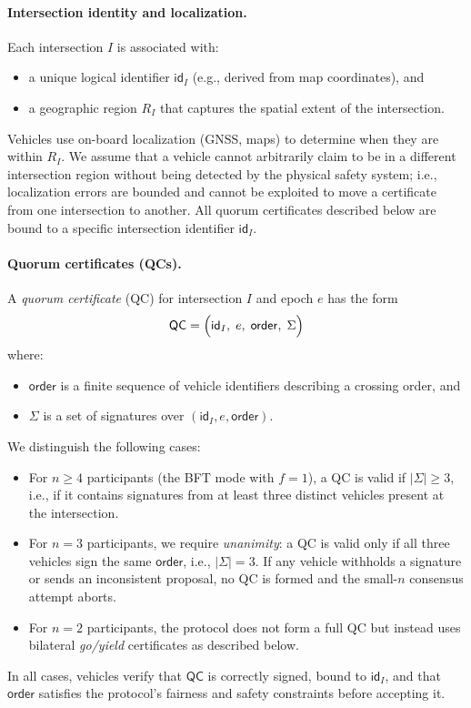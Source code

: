 \documentclass[fleqn,10pt]{olplainarticle}
\begin{document}
\paragraph{Intersection identity and localization.}
Each intersection $I$ is associated with:
\begin{itemize}
  \item a unique logical identifier $\mathsf{id}_I$ (e.g., derived from map coordinates), and
  \item a geographic region $R_I$ that captures the spatial extent of the intersection.
\end{itemize}
Vehicles use on-board localization (GNSS, maps) to determine when they are within $R_I$. We assume that a vehicle cannot arbitrarily claim to be in a different intersection region without being detected by the physical safety system; i.e., localization errors are bounded and cannot be exploited to move a certificate from one intersection to another. All quorum certificates described below are bound to a specific intersection identifier $\mathsf{id}_I$.

\paragraph{Quorum certificates (QCs).}
A \emph{quorum certificate} (QC) for intersection $I$ and epoch $e$ has the form
\[
  \mathsf{QC} = \Bigl(\mathsf{id}_I,\; e,\; \mathsf{order},\; \Sigma\Bigr)
\]
where:
\begin{itemize}
  \item $\mathsf{order}$ is a finite sequence of vehicle identifiers describing a crossing order, and
  \item $\Sigma$ is a set of signatures over $(\mathsf{id}_I, e, \mathsf{order})$.
\end{itemize}
We distinguish the following cases:
\begin{itemize}
  \item For $n \ge 4$ participants (the BFT mode with $f=1$), a QC is valid if $|\Sigma| \ge 3$, i.e., if it contains signatures from at least three distinct vehicles present at the intersection.
  \item For $n = 3$ participants, we require \emph{unanimity}: a QC is valid only if all three vehicles sign the same $\mathsf{order}$, i.e., $|\Sigma| = 3$. If any vehicle withholds a signature or sends an inconsistent proposal, no QC is formed and the small-$n$ consensus attempt aborts.
  \item For $n = 2$ participants, the protocol does not form a full QC but instead uses bilateral \emph{go/yield} certificates as described below.
\end{itemize}
In all cases, vehicles verify that $\mathsf{QC}$ is correctly signed, bound to $\mathsf{id}_I$, and that $\mathsf{order}$ satisfies the protocol's fairness and safety constraints before accepting it.
\end{document}
